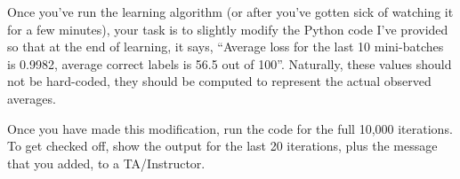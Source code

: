 \documentclass[11pt]{article}
\renewcommand\:{\colon} %
\begin{document}
Once you've run the learning algorithm (or after you've gotten sick of watching it for a few minutes),
your task is to slightly modify the Python code I've provided so that at the end of learning, it says, ``Average
loss for the last 10 mini-batches is 0.9982, average correct labels is 56.5 out of 100''. Naturally, these values
should not be hard-coded, they should be computed to represent the actual observed averages.

Once you have made this modification, run the code for the full 10,000 iterations. To get checked off, show 
the output for the last 20 iterations, plus the message that you added,  to a TA/Instructor.
\end{document}
